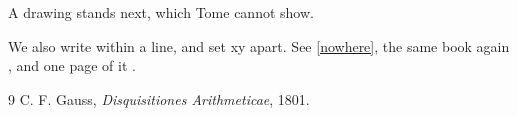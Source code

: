 \documentclass[11pt]{article}
\begin{document}
A drawing stands next, which Tome cannot show.


We also write  within a line, and set x\quad y apart.
See \ref{nowhere}, the same book again \cite{gauss,missing}, and one page of it \cite[p.~3]{gauss}.





\begin{thebibliography}{9}
 C. F. Gauss, \emph{Disquisitiones Arithmeticae}, 1801.
\end{thebibliography}
\end{document}
